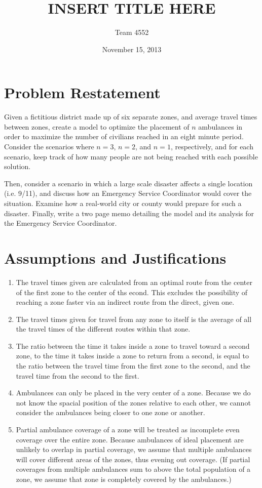 \documentclass[notitlepage, 12pt]{article}
\title{\textbf{INSERT TITLE HERE}}
\author{Team 4552}
\date{November 15, 2013}
\begin{document}
\maketitle

\tableofcontents
\newpage
\section{Problem Restatement}
Given a fictitious district made up of six separate zones, and average travel times between zones, create a model to optimize the placement of $n$ ambulances in order to maximize the number of civilians reached in an eight minute period. Consider the scenarios where $n = 3$, $n = 2$, and $n = 1$, respectively, and for each scenario, keep track of how many people are not being reached with each possible solution.

Then, consider a scenario in which a large scale disaster affects a single location (i.e. 9/11), and discuss how an Emergency Service Coordinator would cover the situation. Examine how a real-world city or county would prepare for such a disaster. Finally, write a two page memo detailing the model and its analysis for the Emergency Service Coordinator.


\section{Assumptions and Justifications}
\begin{enumerate}
    \item
        The travel times given are calculated from an optimal route from the center of the first
        zone to the center of ths econd. This excludes the possibility of reaching a zone faster
        via an indirect route from the direct, given one.
    \item
        The travel times given for travel from any zone to itself is the average
        of all the travel times of the different routes within that zone.
    \item
        The ratio between the time it takes inside a zone to travel toward a second zone,
        to the time it takes inside a zone to return from a second, is equal to the ratio
        between the travel time from the first zone to the second, and the travel time from the
        second to the first.
    \item
        Ambulances can only be placed in the very center of a zone. Because we do not know the
        spacial position of the zones relative to each other, we cannot consider the ambulances
        being closer to one zone or another.
    \item
        Partial ambulance coverage of a zone will be treated as incomplete even coverage over the entire
        zone. Because ambulances of ideal placement are unlikely to overlap in partial coverage, we assume
        that multiple ambulances will cover different areas of the zones, thus evening out coverage.
        (If partial coverages from multiple ambulances sum to above the total population of a zone,
        we assume that zone is completely covered by the ambulances.)
\end{enumerate}
\end{document}
